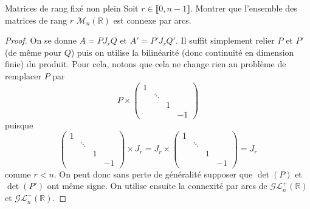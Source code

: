 \documentclass[french,a4paper]{article}
\newcommand{\R}{\mathbb{R}}
\theoremstyle{plain}
\theoremstyle{definition}
\theoremstyle{remark}
\begin{document}
\begin{ex}[Moulin.51]{Matrices de rang fixé non plein}
	Soit $r\in\llbracket0,n-1\rrbracket$. Montrer que l'ensemble des matrices de rang $r$ $\mathcal{M}_n(\R)$ est connexe par arcs.
\end{ex}
\begin{proof}
	On se donne $A=PJ_rQ$ et $A'=P'J_rQ'$. Il suffit simplement relier $P$ et $P'$ (de même pour $Q$) puis on utilise la bilinéarité (donc continuité en dimension finie) du produit. Pour cela, notons que cela ne change rien au problème de remplacer $P$ par $$P\times\begin{pmatrix}
		1&&\\
		&\ddots&&\\
		&&1&\\
		&&&-1
	\end{pmatrix}$$ puisque $$\begin{pmatrix}
		1&&\\
		&\ddots&&\\
		&&1&\\
		&&&-1
	\end{pmatrix}\times J_r=J_r \times \begin{pmatrix}
		1&&\\
		&\ddots&&\\
		&&1&\\
		&&&-1
	\end{pmatrix}=J_r$$ comme $r<n$. On peut donc sans perte de généralité supposer que $\det(P)$ et $\det(P')$ ont même signe. On utilise ensuite la connexité par arcs de $\mathcal{GL}_n^+(\R)$ et $\mathcal{GL}_n^-(\R)$.
\end{proof}
\end{document}
